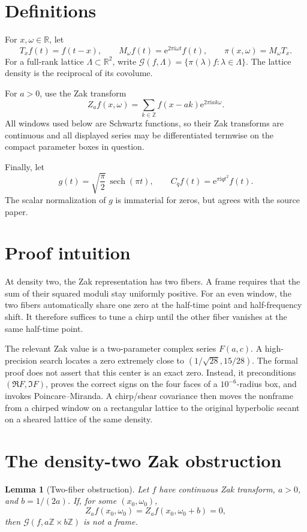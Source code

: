 \documentclass[11pt]{article}
\newtheorem{lemma}[theorem]{Lemma}
\newcommand{\R}{\mathbb R}
\newcommand{\Z}{\mathbb Z}
\newcommand{\sech}{\operatorname{sech}}
\newcommand{\e}{\mathrm e}
\newcommand{\ii}{\mathrm i}
\newcommand{\cG}{\mathcal G}
\begin{document}
\section{Definitions}

For \(x,\omega\in\R\), let
\[
 T_xf(t)=f(t-x),\qquad M_\omega f(t)=\e^{2\pi\ii\omega t}f(t),
 \qquad \pi(x,\omega)=M_\omega T_x.
\]
For a full-rank lattice \(\Lambda\subset\R^2\), write
\(
 \cG(f,\Lambda)=\{\pi(\lambda)f:\lambda\in\Lambda\}.
\)
The lattice density is the reciprocal of its covolume.

For \(a>0\), use the Zak transform
\[
 Z_af(x,\omega)=\sum_{k\in\Z}f(x-ak)\e^{2\pi\ii ak\omega}.
\]
All windows used below are Schwartz functions, so their Zak transforms are
continuous and all displayed series may be differentiated termwise on the
compact parameter boxes in question.

Finally, let
\[
 g(t)=\sqrt{\frac\pi2}\,\sech(\pi t),\qquad
 C_qf(t)=\e^{\pi\ii q t^2}f(t).
\]
The scalar normalization of \(g\) is immaterial for zeros, but agrees with
the source paper.

\section{Proof intuition}

At density two, the Zak representation has two fibers.  A frame requires
that the sum of their squared moduli stay uniformly positive.  For an even
window, the two fibers automatically share one zero at the half-time point
and half-frequency shift.  It therefore suffices to tune a chirp until the
other fiber vanishes at the same half-time point.

The relevant Zak value is a two-parameter complex series \(F(a,c)\).  A
high-precision search locates a zero extremely close to
\((1/\sqrt{28},15/28)\).  The formal proof does not assert that this center
is an exact zero.  Instead, it preconditions \((\Re F,\Im F)\), proves the
correct signs on the four faces of a \(10^{-6}\)-radius box, and invokes
Poincare--Miranda.  A chirp/shear covariance then moves the nonframe from a
chirped window on a rectangular lattice to the original hyperbolic secant
on a sheared lattice of the same density.

\section{The density-two Zak obstruction}

\begin{lemma}[Two-fiber obstruction]\label{lem:zak}
Let \(f\) have continuous Zak transform, \(a>0\), and
\(b=1/(2a)\).  If, for some \((x_0,\omega_0)\),
\[
 Z_af(x_0,\omega_0)=Z_af(x_0,\omega_0+b)=0,
\]
then \(\cG(f,a\Z\times b\Z)\) is not a frame.
\end{lemma}
\end{document}
